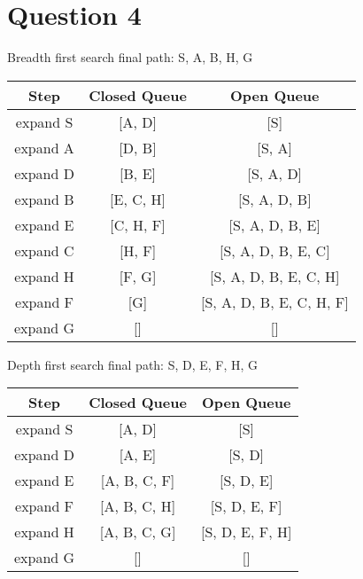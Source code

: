 \documentclass[12pt]{article}
\begin{document}
\section*{Question 4} %
\label{sec:question_4}
Breadth first search final path: S, A, B, H, G
\begin{center}
  \begin{tabular}{|c|c|c|}
    \hline
    \textbf{Step} & \textbf{Closed Queue} & \textbf{Open Queue} \\ \hline
    expand S & [A, D] & [S] \\ \hline
    expand A & [D, B] & [S, A] \\ \hline
    expand D & [B, E] & [S, A, D] \\ \hline
    expand B & [E, C, H] & [S, A, D, B] \\ \hline
    expand E & [C, H, F] & [S, A, D, B, E] \\ \hline
    expand C & [H, F] & [S, A, D, B, E, C] \\ \hline
    expand H & [F, G] & [S, A, D, B, E, C, H] \\ \hline
    expand F & [G] & [S, A, D, B, E, C, H, F] \\ \hline
    expand G & [] & [] \\ \hline
  \end{tabular}
\end{center}

Depth first search final path: S, D, E, F, H, G
\begin{center}
  \begin{tabular}{|c|c|c|}
    \hline
    \textbf{Step} & \textbf{Closed Queue} & \textbf{Open Queue} \\ \hline
    expand S & [A, D] & [S] \\ \hline
    expand D & [A, E] & [S, D] \\ \hline
    expand E & [A, B, C, F] & [S, D, E] \\ \hline
    expand F & [A, B, C, H] & [S, D, E, F]\\ \hline
    expand H & [A, B, C, G] & [S, D, E, F, H]\\ \hline
    expand G & [] & [] \\ \hline
  \end{tabular}
\end{center}
\end{document}
